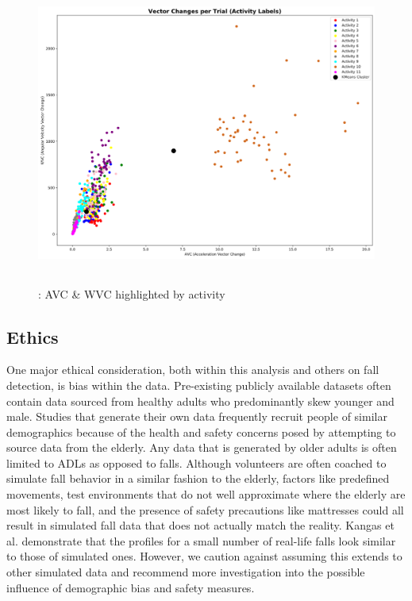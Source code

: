 \documentclass{llncs}
\begin{document}


\begin{figure} 
	\centering
	\includegraphics[width=12cm, height=10cm]{images/VC_11clusters.png} 
	\caption{: AVC \& WVC highlighted by activity}
	\label{Figure 6: K-Means Clusters of AVC and WVC Values per Trial}
\end{figure}



\subsection{Ethics}

One major ethical consideration, both within this analysis and others on fall detection, is bias within the data. Pre-existing publicly available datasets often contain data sourced from healthy adults who predominantly skew younger and male.\cite{casilari2017analysis} Studies that generate their own data frequently recruit people of similar demographics because of the health and safety concerns posed by attempting to source data from the elderly.\cite{gjoreski2016accurately} Any data that is generated by older adults is often limited to ADLs as opposed to falls. Although volunteers are often coached to simulate fall behavior in a similar fashion to the elderly, factors like predefined movements, test environments that do not well approximate where the elderly are most likely to fall, and the presence of safety precautions like mattresses could all result in simulated fall data that does not actually match the reality.\cite{casilari2017analysis} Kangas et al. demonstrate that the profiles for a small number of real-life falls look similar to those of simulated ones.\cite{kangas2008comparison} However, we caution against assuming this extends to other simulated data and recommend more investigation into the possible influence of demographic bias and safety measures.
	
\end{document}
